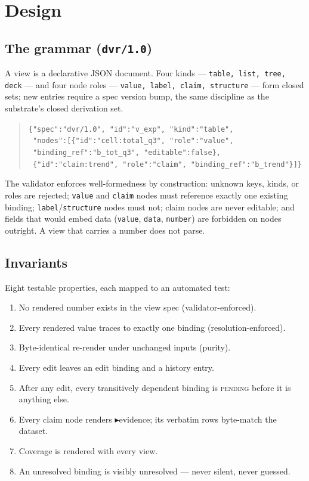 \documentclass[11pt]{article}
\newcommand{\ev}{\ensuremath{\blacktriangleright}}
\begin{document}
\section{Design}\label{sec:design}

\subsection{The grammar (\texttt{dvr/1.0})}

A view is a declarative JSON document. Four kinds --- \texttt{table, list, tree, deck} ---
and four node roles --- \texttt{value, label, claim, structure} --- form closed sets; new
entries require a spec version bump, the same discipline as the substrate's closed
derivation set.

\begin{quote}\small
\texttt{\{"spec":"dvr/1.0", "id":"v\_exp", "kind":"table",}\\
\texttt{ "nodes":[\{"id":"cell:total\_q3", "role":"value",}\\
\texttt{ \phantom{"nodes":[} "binding\_ref":"b\_tot\_q3", "editable":false\},}\\
\texttt{ \phantom{"nodes":[} \{"id":"claim:trend", "role":"claim", "binding\_ref":"b\_trend"\}]\}}
\end{quote}

The validator enforces well-formedness by construction: unknown keys, kinds, or roles are
rejected; \texttt{value} and \texttt{claim} nodes must reference exactly one existing
binding; \texttt{label}/\texttt{structure} nodes must not; claim nodes are never
editable; and fields that would embed data (\texttt{value}, \texttt{data},
\texttt{number}) are forbidden on nodes outright. A view that carries a number does not
parse.

\subsection{Invariants}

Eight testable properties, each mapped to an automated test:

\begin{enumerate}
  \item No rendered number exists in the view spec (validator-enforced).
  \item Every rendered value traces to exactly one binding (resolution-enforced).
  \item Byte-identical re-render under unchanged inputs (purity).
  \item Every edit leaves an edit binding and a history entry.
  \item After any edit, every transitively dependent binding is \textsc{pending} before
        it is anything else.
  \item Every claim node renders \ev evidence; its verbatim rows byte-match the dataset.
  \item Coverage is rendered with every view.
  \item An unresolved binding is visibly unresolved --- never silent, never guessed.
\end{enumerate}
\end{document}
